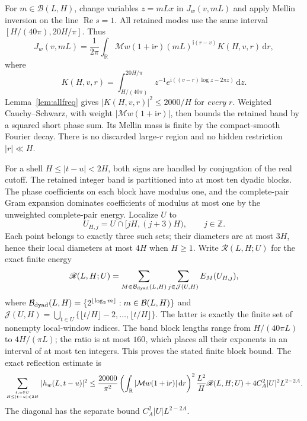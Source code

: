 \documentclass[11pt,a4paper]{article}
\numberwithin{equation}{section}
\theoremstyle{definition}
\newcommand{\R}{\mathbb R}
\newcommand{\Z}{\mathbb Z}
\newcommand{\dd}{\,\mathrm d}
\newcommand{\ii}{\mathrm i}
\newcommand{\Rea}{\operatorname{Re}}
\newcommand{\Mell}{\mathcal M}
\begin{document}
For $m\in\mathcal B(L,H)$, change variables $z=mLx$ in $J_w(v,mL)$ and
apply Mellin inversion on the line $\Rea s=1$. All retained modes use the same
interval $[H/(40\pi),20H/\pi]$. Thus
\[
 J_w(v,mL)=\frac1{2\pi}\int_{\R}\Mell w(1+\ii r)
 (mL)^{\ii(r-v)}K(H,v,r)\dd r,
\]
where
\[
 K(H,v,r)=\int_{H/(40\pi)}^{20H/\pi}
 z^{-1}e^{\ii((v-r)\log z-2\pi z)}\dd z.
\]
Lemma~\ref{lem:allfreq} gives $|K(H,v,r)|^2\le2000/H$ for \emph{every}
$r$. Weighted Cauchy--Schwarz, with weight $|\Mell w(1+\ii r)|$, then
bounds the retained band by a squared short phase sum. Its Mellin mass is
finite by the compact-smooth Fourier decay. There is no discarded large-$r$
region and no hidden restriction $|r|\ll H$.

For a shell $H\le|t-u|<2H$, both signs are handled by conjugation of the real
cutoff. The retained integer band is partitioned into at most ten dyadic blocks.
The phase coefficients on each block have modulus one, and the complete-pair
Gram expansion dominates coefficients of modulus at most one by the
unweighted complete-pair energy. Localize $U$ to
\[
 U_{H,j}=U\cap[jH,(j+3)H),\qquad j\in\Z.
\]
Each point belongs to exactly three such sets; their diameters are at most
$3H$, hence their local diameters at most $4H$ when $H\ge1$.
Write $\mathscr R(L,H;U)$ for the exact finite energy
\[
 \mathscr R(L,H;U)=\sum_{M\in\mathcal B_{\rm dyad}(L,H)}
                     \sum_{j\in\mathcal J(U,H)}E_M(U_{H,j}),
\]
where $\mathcal B_{\rm dyad}(L,H)=\{2^{\lfloor\log_2m\rfloor}:m\in\mathcal B(L,H)\}$
and $\mathcal J(U,H)=\bigcup_{t\in U}\{\lfloor t/H\rfloor-2,\ldots,\lfloor t/H\rfloor\}$.
The latter is exactly the finite set of nonempty local-window indices.
The band block lengths range from $H/(40\pi L)$ to $4H/(\pi L)$;
the ratio is at most $160$, which places all their exponents in an interval
of at most ten integers. This proves the stated finite block bound.
The exact reflection estimate is
\begin{equation}\label{eq:reflection}
 \sum_{t,u\in U\atop H\le|t-u|<2H}|h_w(L,t-u)|^2
 \le\frac{20000}{\pi^2}\left(\int_{\R}|\Mell w(1+\ii r)|\dd r\right)^2
 \frac{L^2}{H}\mathscr R(L,H;U)
 +4C_A^2|U|^2L^{2-2A}.
\end{equation}
The diagonal has the separate bound $C_A^2|U|L^{2-2A}$.
\end{document}
